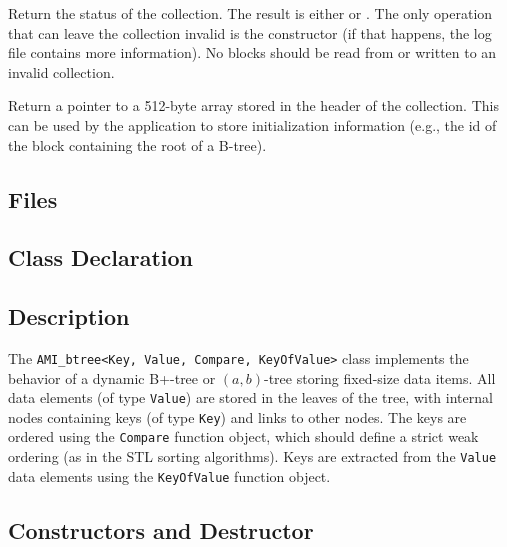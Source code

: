 	 {Return
	the status of the collection. The result is either
	 or
	. The only operation that
	can leave the collection invalid is the constructor (if that
	happens, the log file contains more information). No blocks should
	be read from or written to an invalid collection.}

	 {Return a pointer to a 512-byte array
	stored in the header of the collection. This can be used by the
	application to store initialization information (e.g., the id of
	the block containing the root of a B-tree).}

   \etabb
{}



\subsection{Files}
\btabb
    {}
\etabb

\subsection{Class Declaration}

\btabb
    {}
\etabb

\subsection{Description}

The {\tt AMI\_btree<Key, Value, Compare, KeyOfValue>} class implements the
behavior of a dynamic B+-tree or $(a,b)$-tree storing fixed-size data
items. All data elements (of type {\tt Value}) are stored in the leaves of
the tree, with internal nodes containing keys (of type {\tt Key}) and links
to other nodes. The keys are ordered using the {\tt Compare} function
object, which should define a strict weak ordering (as in the STL sorting
algorithms). Keys are extracted from the {\tt Value} data elements using
the {\tt KeyOfValue} function object.

\subsection{Constructors and Destructor}

